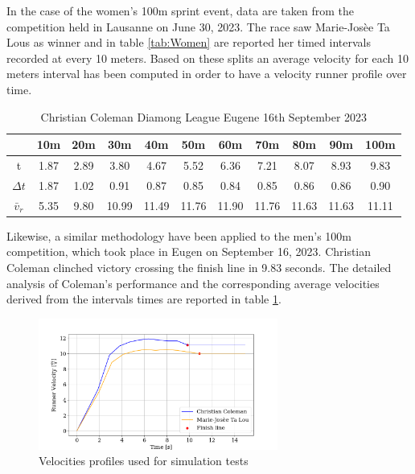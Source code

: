 \documentclass[a4paper,12pt,oneside]{book}
\begin{document}
In the case of the women's 100m sprint event, data are taken from the competition held in Lausanne on June 30, 2023.  
The race saw Marie-Josèe Ta Lous as winner and in table \ref{tab:Women} are reported her timed intervals recorded at every 10 meters. 
Based on these splits an average velocity for each 10 meters interval has been computed in order to have a velocity runner profile over time.

\begin{table}[htbp]
	\centering
	\begin{adjustbox}{max width=\textwidth}
	\begin{tabular}{c|c|c|c|c|c|c|c|c|c|c}
           & 10m & 20m & 30m & 40m & 50m & 60m & 70m & 80m & 90m &100m \\
	\hline
	\hline
	t & 1.87 & 2.89 & 3.80 & 4.67 & 5.52 & 6.36 & 7.21 & 8.07 & 8.93 & 9.83  \\	
	$\Delta t$ & 1.87 & 1.02 & 0.91 & 0.87 & 0.85 & 0.84 & 0.85 & 0.86 & 0.86 & 0.90 \\
	$\bar{v}_r$ & 5.35 & 9.80 & 10.99 & 11.49 & 11.76 & 11.90 & 11.76 & 11.63 & 11.63 & 11.11 \\
	\hline
	\end{tabular}
	\end{adjustbox}
\caption{Christian Coleman Diamong League Eugene 16th September 2023}
\label{tab:Man}
\end{table}

Likewise, a similar methodology have been applied to the men's 100m competition, which took place in Eugen on September 16, 2023.
Christian Coleman clinched victory crossing the finish line in 9.83 seconds.
The detailed analysis of Coleman's performance and the corresponding average velocities derived from the intervals times are reported in table \ref{tab:Man}.

\begin{figure}[!h]
	\centering
	\includegraphics[width=0.7\textwidth]{Test_Velocities.png}
\caption{Velocities profiles used for simulation tests}
\label{Test_Velocities}
\end{figure}
\end{document}
